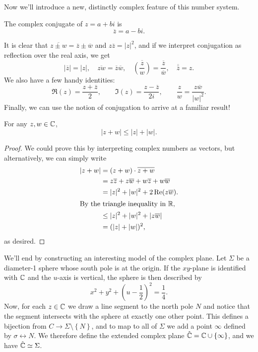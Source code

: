 \documentclass[../m136main.tex]{subfiles}
\begin{document}
Now we'll introduce a new, distinctly complex feature of this number system.

\begin{definition}
    The complex conjugate of $z = a + bi$ is
    \[ \overline z = a - bi. \]
\end{definition}

It is clear that $\overline{z \pm w} = \overline z \pm \overline w$ and $z \overline z = |z|^2$, and if we interpret conjugation as reflection over the real axis, we get
\[ |\overline z| = |z|, \quad \overline{zw} = \overline z \overline w, \quad \overline{\left( \frac{z}{w} \right)} = \frac{\overline z}{\overline w}, \quad \overline{\bar z} = z. \]
We also have a few handy identities:
\[ \Re(z) = \frac{z + \overline z}{2}, \qquad \Im(z) = \frac{z - \overline z}{2i}, \qquad \frac{z}{w} = \frac{z \overline w}{|w|^2}. \]
Finally, we can use the notion of conjugation to arrive at a familiar result!

\begin{theorem}
    For any $z,w \in \mathbb{C}$,
    \[ |z + w| \leq |z| + |w|. \]
\end{theorem}

\begin{proof}
    We could prove this by interpreting complex numbers as vectors, but alternatively, we can simply write
    \begin{align*}
        |z + w| &= (z + w) \cdot \overline{z + w} \\
        &= z \overline z + z \overline w + w \overline z + w \overline w \\
        &= |z|^2 + |w|^2 + 2 \operatorname{Re}(z \overline w). \\
        \intertext{By the triangle inequality in $\mathbb{R}$,}
        &\leq |z|^2 + |w|^2 + |z \overline w| \\
        &= (|z| + |w|)^2,
    \end{align*}
    as desired.
\end{proof}

We'll end by constructing an interesting model of the complex plane.
Let $\Sigma$ be a diameter-1 sphere whose south pole is at the origin.
If the $xy$-plane is identified with $\mathbb{C}$ and the $u$-axis is vertical, the sphere is then described by
\[ x^2 + y^2 + \left( u - \frac{1}{2} \right)^2 = \frac{1}{4}. \]
Now, for each $z \in \mathbb{C}$ we draw a line segment to the north pole $N$ and notice that the segment intersects with the sphere at exactly one other point.
This defines a bijection from $C \to \Sigma \setminus \left\{ N \right\}$, and to map to all of $\Sigma$ we add a point $\infty$ defined by $\sigma \leftrightarrow N$.
We therefore define the extended complex plane $\hat {\mathbb{C}} = \mathbb{C} \cup \left\{ \infty \right\}$, and we have $\hat {\mathbb{C}} \simeq \Sigma$.
\end{document}
